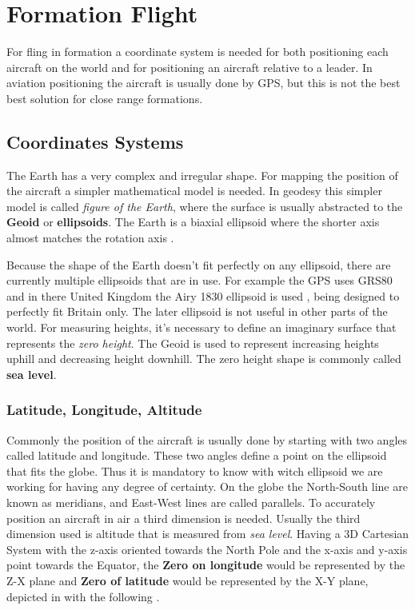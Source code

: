 \chapter{Formation Flight}
\label{chapter:formation-flight}
For fling in formation a coordinate system is needed for both positioning each 
aircraft on the world and for positioning an aircraft relative to a leader. In
aviation positioning the aircraft is usually done by GPS, but this is not the best best solution for close range formations.

\section{Coordinates Systems}
\label{sec:coordinates-systems}
The Earth has a very complex and irregular shape. For mapping the position of
the aircraft a simpler mathematical model is needed. In geodesy this simpler
model is called \textit{figure of the Earth}, where the surface is usually
abstracted to the \textbf{Geoid} or \textbf{ellipsoids}. The Earth is a biaxial 
ellipsoid where the shorter axis almost matches the rotation axis \cite{gb-coordinates}.

Because the shape of the Earth doesn't fit perfectly on any ellipsoid, there
are currently multiple ellipsoids that are in use. For example the GPS uses
GRS80 \cite{gsr80} and in there
United Kingdom the Airy 1830 ellipsoid is used \cite{gb-coordinates},  being 
designed to perfectly fit Britain only. The later ellipsoid is not useful in 
other parts of the world. For measuring heights, it's necessary to define an
imaginary surface that represents the \textit{zero height}. The Geoid is used
to represent increasing heights uphill and decreasing height downhill. The
zero height shape is commonly called \textbf{sea level}.

\subsection{Latitude, Longitude,  Altitude}
\label{sub-sec:lla}
Commonly the position of the aircraft is usually done by starting with 
two angles called latitude and longitude. These two angles define a point
on the ellipsoid that fits the globe. Thus it is mandatory to know with witch
ellipsoid we are working for having any degree of certainty. On the globe
the North-South line are known as meridians,  and East-West lines are called 
parallels. To accurately position an aircraft in air a third dimension is needed.
Usually the third dimension used is altitude that is measured from \textit{sea level}.
Having a 3D Cartesian System with the z-axis oriented towards the North Pole and
the x-axis and y-axis point towards the Equator, the \textbf{Zero on longitude}
would be represented by the Z-X plane and \textbf{Zero of latitude} would be 
represented by the X-Y plane, depicted in \cite{gb-coordinates} with the following
.
% 
\newpage


